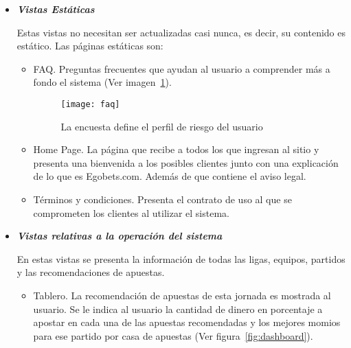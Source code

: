 \begin{itemize}
\begin{itemize}
			\end{itemize}


			\item \emph{\textbf{Vistas Estáticas}}



			Estas vistas no necesitan ser actualizadas casi nunca, es decir, su contenido es estático. Las páginas estáticas son:
			\begin{itemize}
				\item FAQ. Preguntas frecuentes que ayudan al usuario a comprender más a fondo el sistema (Ver imagen~\ref{Fig:faq}).

				\begin{figure}[!htb]\centering
				   \begin {minipage}{0.75\textwidth}
				     \texttt{[image: faq]}
				     \caption{La encuesta define el perfil de riesgo del usuario}\label{Fig:faq}
				   \end{minipage}
				\end{figure}

				\item Home Page. La página que recibe a todos los que ingresan al sitio y presenta una bienvenida a los posibles clientes junto con una explicación de lo que es Egobets.com. Además de que contiene el aviso legal.
				\item Términos y condiciones. Presenta el contrato de uso al que se comprometen los clientes al utilizar el sistema.
			\end{itemize}


			\item \emph{\textbf{Vistas relativas a la operación del sistema}}


			En estas vistas se presenta la información de todas las ligas, equipos, partidos y las recomendaciones de apuestas.

			\begin{itemize}

				\item Tablero. La recomendación de apuestas de esta jornada es mostrada al usuario. Se le indica al usuario la cantidad de dinero en porcentaje a apostar en cada una de las apuestas recomendadas y los mejores momios para ese partido por casa de apuestas (Ver figura~\ref{fig:dashboard}).


\end{itemize}
\end{itemize}
